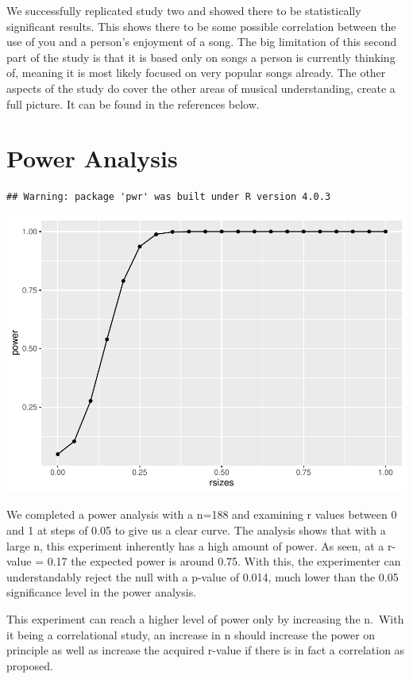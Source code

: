 \documentclass[
  english,
  man]{apa6}
\begin{document}
We successfully replicated study two and showed there to be statistically significant results. This shows there to be some possible correlation between the use of you and a person's enjoyment of a song. The big limitation of this second part of the study is that it is based only on songs a person is currently thinking of, meaning it is most likely focused on very popular songs already. The other aspects of the study do cover the other areas of musical understanding, create a full picture. It can be found in the references below.

\hypertarget{power-analysis}{%
\section{Power Analysis}\label{power-analysis}}

\begin{verbatim}
## Warning: package 'pwr' was built under R version 4.0.3
\end{verbatim}

\includegraphics{finalprojectapa_files/figure-latex/unnamed-chunk-2-1.pdf}

We completed a power analysis with a n=188 and examining r values between 0 and 1 at steps of 0.05 to give us a clear curve. The analysis shows that with a large n, this experiment inherently has a high amount of power. As seen, at a r-value = 0.17 the expected power is around 0.75. With this, the experimenter can understandably reject the null with a p-value of 0.014, much lower than the 0.05 significance level in the power analysis.

This experiment can reach a higher level of power only by increasing the n.~With it being a correlational study, an increase in n should increase the power on principle as well as increase the acquired r-value if there is in fact a correlation as proposed.
\end{document}
